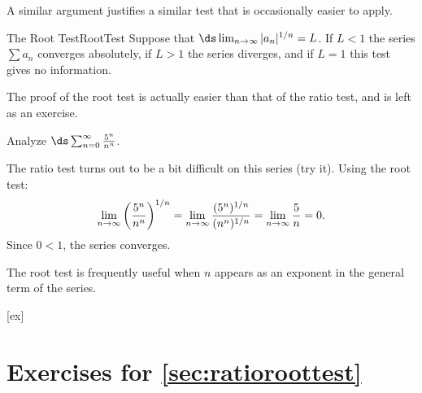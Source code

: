 A similar argument justifies a similar test
that is occasionally easier to apply. 

\begin{theorem}{The Root Test}{RootTest}
Suppose that $\ds\lim_{n\to \infty} |a_n|^{1/n}=L$. If $L<1$
the series $\sum a_n$ converges absolutely, 
if $L>1$ the series diverges, and if
$L=1$ this test gives no information.
\end{theorem}

The proof of the root test is actually easier than that of the ratio
test, and is left as an exercise.

\begin{example}{}{}
Analyze $\ds\sum_{n=0}^\infty {5^n\over n^n}$.
\end{example}
\begin{solution}
The ratio test turns out to be a bit difficult on this series (try
it). Using the root test:
$$
  \lim_{n\to\infty} \left({5^n\over n^n}\right)^{1/n}=
  \lim_{n\to\infty} {(5^n)^{1/n}\over (n^n)^{1/n}}=
  \lim_{n\to\infty} {5\over n}=0.
$$
Since $0<1$, the series converges.
\end{solution}

The root test is frequently useful when $n$ appears as an exponent in
the general term of the series.

[ex]
\section*{Exercises for \ref{sec:ratioroottest}}

